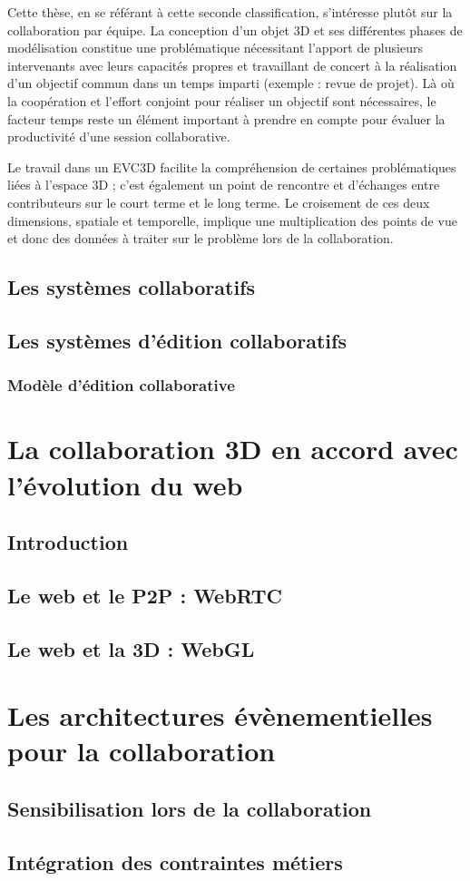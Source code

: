 Cette thèse, en se référant à cette seconde classification, s'intéresse plutôt 
sur la collaboration par équipe. La conception d'un objet 3D et ses différentes 
phases de modélisation constitue une problématique nécessitant l'apport de 
plusieurs intervenants avec leurs capacités propres et travaillant de concert à la 
réalisation d'un objectif commun dans un temps imparti (exemple : revue de 
projet). Là où la coopération et l'effort conjoint pour réaliser un objectif sont 
nécessaires, le facteur temps reste un élément important à prendre en compte 
pour évaluer la productivité d'une session collaborative.

Le travail dans un \gls{EVC3D} facilite la compréhension 
de certaines problématiques liées à l'espace 3D ; c'est également un point de 
rencontre et d'échanges entre contributeurs sur le court terme et le long terme. 
Le croisement de ces deux dimensions, spatiale et temporelle, implique une 
multiplication des points de vue et donc des données à traiter sur le problème lors 
de la collaboration.

\subsection{Les systèmes collaboratifs}
\subsection{Les systèmes d'édition collaboratifs}
\subsubsection{Modèle d'édition collaborative}

\section{La collaboration 3D en accord avec l'évolution du web}

\subsection{Introduction}
\subsection{Le web et le P2P : WebRTC}
\subsection{Le web et la 3D :  WebGL}

\section{Les architectures évènementielles pour la collaboration}
\subsection{Sensibilisation lors de la collaboration}
\subsection{Intégration des contraintes métiers}
